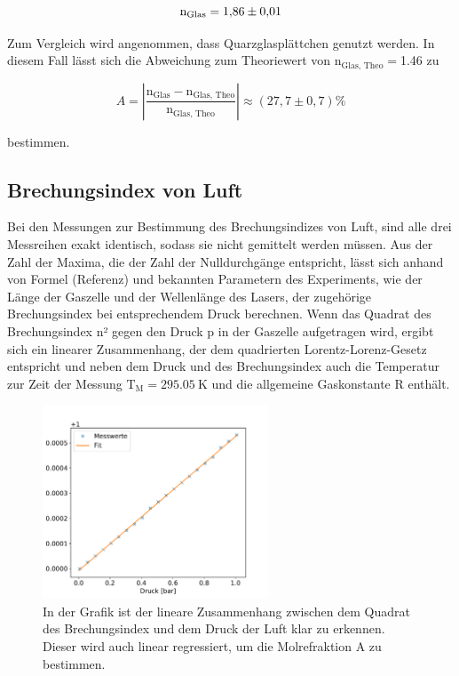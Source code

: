         \begin{equation}
            \text{n}_{\text{Glas}} = \num{1.86 +- 0.01}
        \end{equation}

        Zum Vergleich wird angenommen, dass Quarzglasplättchen genutzt werden. In diesem Fall lässt sich die Abweichung zum Theoriewert von $\text{n}_{\text{Glas, Theo}}=$\num{1.46}\cite{theeten_new_1978} zu

        \begin{equation*}
            A= \left|\frac{\text{n}_{\text{Glas}} - \text{n}_{\text{Glas, Theo}}}{\text{n}_{\text{Glas, Theo}}}\right| \approx (27,7 \pm 0,7) \%
        \end{equation*}

        bestimmen.


    \subsection{Brechungsindex von Luft}
        Bei den Messungen zur Bestimmung des Brechungsindizes von Luft, sind alle drei Messreihen exakt identisch, sodass sie nicht gemittelt werden müssen. Aus der Zahl der Maxima, die der Zahl der 
        Nulldurchgänge entspricht, lässt sich anhand von Formel (Referenz) und bekannten Parametern des Experiments, wie der Länge der Gaszelle und der Wellenlänge des Lasers, der zugehörige Brechungsindex
        bei entsprechendem Druck berechnen. Wenn das Quadrat des Brechungsindex n² gegen den Druck p in der Gaszelle aufgetragen wird, ergibt sich ein linearer Zusammenhang, der dem quadrierten Lorentz-Lorenz-Gesetz entspricht und neben dem Druck und des Brechungsindex auch die Temperatur zur Zeit der Messung $\text{T}_{\text{M}}=\SI{295.05}{\kelvin}$ und die allgemeine Gaskonstante R enthält. 


        \FloatBarrier

        \begin{figure}[h]
          \centering
          \includegraphics[width = 0.6\textwidth]{pictures/n_quad_fit.pdf}
          \caption{In der Grafik ist der lineare Zusammenhang zwischen dem Quadrat des Brechungsindex und dem Druck der Luft klar zu erkennen. Dieser wird auch linear regressiert, um die Molrefraktion A zu bestimmen.}
          \label{fig:Aufbau}
        \end{figure}

